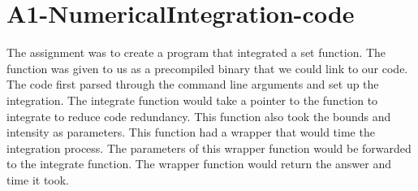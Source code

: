 \documentclass{article}
\begin{document}
	\section{A1-NumericalIntegration-code}
	The assignment was to create a program that integrated a set function. The function was given to us as a precompiled binary that we could link to our code. The code first parsed through the command line arguments and set up the integration. The integrate function would take a pointer to the function to integrate to reduce code redundancy. This function also took the bounds and intensity as parameters. This function had a wrapper that would time the integration process. The parameters of this wrapper function would be forwarded to the integrate function. The wrapper function would return the answer and time it took.
\end{document}
